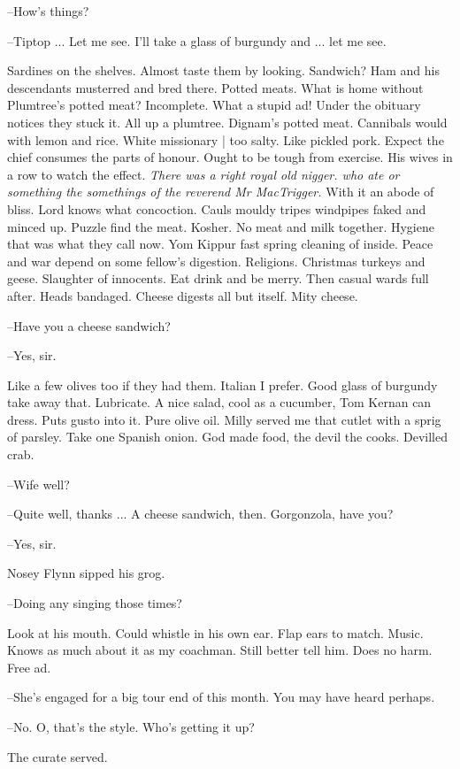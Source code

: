 --How's things?

--Tiptop ...
Let me see.
I'll take a glass of burgundy and ...
let me see.

Sardines on the shelves.
Almost taste them by looking.
Sandwich?
Ham and his descendants musterred and bred there.
Potted meats.
What is home without Plumtree's potted meat?
Incomplete.
What a stupid ad!
Under the obituary notices they stuck it.
All up a plumtree.
Dignam's potted meat.
Cannibals would with lemon and rice.
White missionary |
too salty.
Like pickled pork.
Expect the chief consumes the parts of honour.
Ought to be tough from exercise.
His wives in a row to watch the effect.
\emph{There was a right royal old nigger.
who ate or something the somethings
of the reverend Mr MacTrigger.}
With it an abode of bliss.
Lord knows what concoction.
Cauls mouldy tripes windpipes faked and minced up.
Puzzle find the meat.
Kosher.
No meat and milk together.
Hygiene that was what they call now.
Yom Kippur fast spring cleaning of inside.
Peace and war depend on some fellow's digestion.
Religions.
Christmas turkeys and geese.
Slaughter of innocents.
Eat drink and be merry.
Then casual wards full after.
Heads bandaged.
Cheese digests all but itself.
Mity cheese.

--Have you a cheese sandwich?

--Yes,
sir.

Like a few olives too if they had them.
Italian I prefer.
Good glass of burgundy take away that.
Lubricate.
A nice salad,
cool as a cucumber,
Tom Kernan can dress.
Puts gusto into it.
Pure olive oil.
Milly served me that cutlet with a sprig of parsley.
Take one Spanish onion.
God made food,
the devil the cooks.
Devilled crab.

--Wife well?

--Quite well,
thanks ...
A cheese sandwich,
then.
Gorgonzola,
have you?

--Yes,
sir.

Nosey Flynn sipped his grog.

--Doing any singing those times?

Look at his mouth.
Could whistle in his own ear.
Flap ears to match.
Music.
Knows as much about it as my coachman.
Still better tell him.
Does no harm.
Free ad.

--She's engaged for a big tour end of this month.
You may have heard perhaps.

--No.
O, that's the style.
Who's getting it up?

The curate served.

